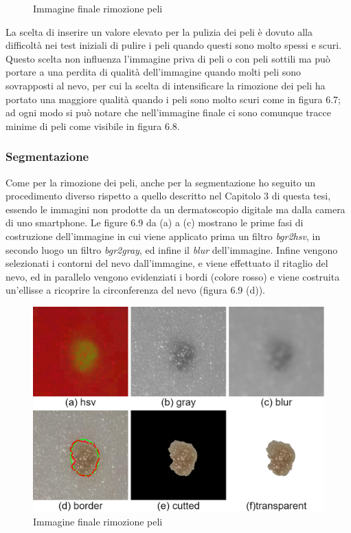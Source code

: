 {\begin{figure}[h]
\begin{center}
	\end{center}
	\caption{Immagine finale rimozione peli}	
\end{figure}
La scelta di inserire un valore elevato per la pulizia dei peli è dovuto alla difficoltà nei test iniziali di pulire i peli quando questi sono molto spessi e scuri. Questo scelta non influenza l'immagine priva di peli o con peli sottili ma può portare a una perdita di qualità dell'immagine quando molti peli sono sovrapposti al nevo, per cui la scelta di intensificare la rimozione dei peli ha portato una maggiore qualità quando i peli sono molto scuri come in figura 6.7; ad ogni modo si può notare che nell'immagine finale ci sono comunque tracce minime di peli come visibile in figura 6.8.
\newpage
\subsubsection{Segmentazione}
Come per la rimozione dei peli, anche per la segmentazione ho seguito un procedimento diverso rispetto a quello descritto nel Capitolo 3 di questa tesi, essendo le immagini non prodotte da un dermatoscopio digitale ma dalla camera di uno smartphone.
\newline
Le figure 6.9 da (a) a (c) mostrano le prime fasi di costruzione dell'immagine in cui viene applicato prima un filtro \textit{bgr2hsv}, in secondo luogo un filtro \textit{bgr2gray}, ed infine il \textit{blur} dell'immagine.
\newline
Infine vengono selezionati i contorni del nevo dall'immagine, e viene effettuato il ritaglio del nevo, ed in parallelo vengono evidenziati i bordi (colore rosso) e viene costruita un'ellisse a ricoprire la circonferenza del nevo (figura 6.9 (d)). 
\begin{figure}[h]
	\begin{center}
		\includegraphics[scale=0.3]{figure/capitolo6/borderlist.png}
	\end{center}
	\caption{Immagine finale rimozione peli}	
\end{figure}
\newpage
}
